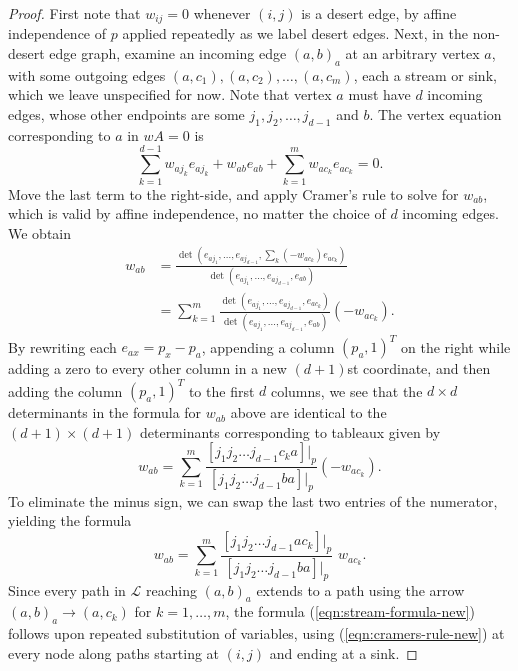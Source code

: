 \documentclass[11pt,letterpaper]{amsart}
\theoremstyle{definition}
\begin{document}
\begin{proof}
    First note that $w_{ij} = 0$ whenever $(i,j)$ is a desert edge, by affine independence of $p$ applied repeatedly as we label desert edges.
    Next, in the non-desert edge graph, examine an incoming edge $(a,b)_a$ at an arbitrary vertex $a$, with some outgoing edges $(a,c_1), (a,c_2),\dots,(a,c_m)$, each a stream or sink, which we leave unspecified for now. Note that vertex $a$ must have $d$ incoming edges, whose other endpoints are some $j_1,j_2,\dots,j_{d-1}$ and $b$. The vertex equation corresponding to $a$ in $wA=0$ is
    \begin{equation*}
        \sum_{k=1}^{d-1} w_{aj_k} e_{aj_k} + w_{ab}e_{ab} + \sum_{k=1}^m w_{ac_k} e_{ac_k} = 0.
    \end{equation*}
    Move the last term to the right-side, and apply Cramer's rule to solve for $w_{ab}$, which is valid by affine independence, no matter the choice of $d$ incoming edges. We obtain
    \begin{align*}
        w_{ab} &= \frac{  \det(e_{aj_1}, \dots, e_{aj_{d-1}}, \sum_k(-w_{ac_k})e_{ac_k} )  }{   \det(e_{aj_1}, \dots, e_{aj_{d-1}}, e_{ab})   } \\
        &= \sum_{k=1}^m \frac{  \det(e_{aj_1}, \dots, e_{aj_{d-1}}, e_{ac_k} )  }{   \det(e_{aj_1}, \dots, e_{aj_{d-1}}, e_{ab})   } (-w_{ac_k}).
    \end{align*}
    By rewriting each $e_{a x} = p_x - p_a$, appending a column $(p_a, 1)^T$ on the right while adding a zero to every other column in a new $(d+1)$st coordinate, and then adding the column $(p_a, 1)^T$ to the first $d$ columns, we see that the $d \times d$ determinants in the formula for $w_{ab}$ above are identical to the $(d+1) \times (d+1)$ determinants corresponding to tableaux given by
    \begin{equation*}
        w_{ab} = \sum_{k=1}^m \frac{  [j_1 j_2 \dots j_{d-1} c_k a]|_p  }{   [j_1 j_2 \dots j_{d-1} b a]|_p   } (-w_{ac_k}).
    \end{equation*}
    To eliminate the minus sign, we can swap the last two entries of the numerator, yielding the formula
    \begin{equation}\label{eqn:cramers-rule-new}
        w_{ab} = \sum_{k=1}^m \frac{  [j_1 j_2 \dots j_{d-1} a c_k]|_p  }{   [j_1 j_2 \dots j_{d-1} b a]|_p   } \,\, w_{ac_k}.
    \end{equation}
    Since every path in $\mathcal{L}$ reaching $(a,b)_a$ extends to a path using the arrow $(a,b)_a \to (a,c_k)$ for $k=1,\dots,m$, the formula (\ref{eqn:stream-formula-new}) follows upon repeated substitution of variables, using (\ref{eqn:cramers-rule-new}) at every node along paths starting at $(i,j)$ and ending at a sink.
\end{proof}
\end{document}
